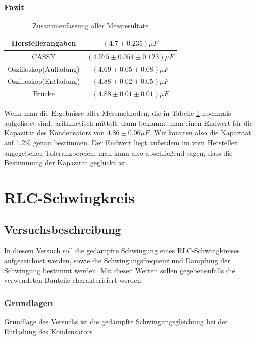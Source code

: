 \documentclass[12pt,a4paper]{article}
\begin{document}
\subsubsection{Fazit}
\begin{table}[H]
\begin{center}
\begin{tabular}{|c|c|}
\hline 
Herstellerangaben & $(4.7\pm0.235)\mu F$\\ 
\hline 
CASSY & $(4.975\pm 0.054\pm0.123)\mu F$\\
\hline 
Oszilloskop(Aufladung) & $(4.69\pm 0.05\pm 0.08)\mu F$ \\ 
\hline 
Oszilloskop(Entladung) & $(4.88\pm 0.02\pm 0.05)\mu F$ \\ 
\hline 
Brücke & $(4.88\pm0.01\pm0.01)\mu F$ \\ 
\hline 
\end{tabular} 
\end{center}
\caption{Zusammenfassung aller Messresultate}
\label{tab:kondzusammenfassung}
\end{table}
Wenn man die Ergebnisse aller Messmethoden, die in Tabelle \ref{tab:kondzusammenfassung} nochmals aufgelistet sind, arithmetisch mittelt, dann bekommt man einen Endwert für die Kapazität des Kondensators von $4.86\pm 0.06 \mu F$. Wir konnten also die Kapazität auf 1,2\% genau bestimmen. Der Endwert liegt außerdem im vom Hersteller angegebenen Toleranzbereich, man kann also abschließend sagen, dass die Bestimmung der Kapazität geglückt ist.
\newpage

\section{RLC-Schwingkreis}
\subsection{Versuchsbeschreibung}

In diesem Versuch soll die gedämpfte Schwingung eines RLC-Schwingkreises aufgezeichnet werden, sowie die Schwingungsfrequenz und Dämpfung der Schwingung bestimmt werden.
Mit diesen Werten sollen gegebenenfalls die verwendeten Bauteile charakterisiert werden.

\subsubsection{Grundlagen}
Grundlage des Versuchs ist die gedämpfte Schwingungsgleichung bei der Entladung des Kondensators
\end{document}
